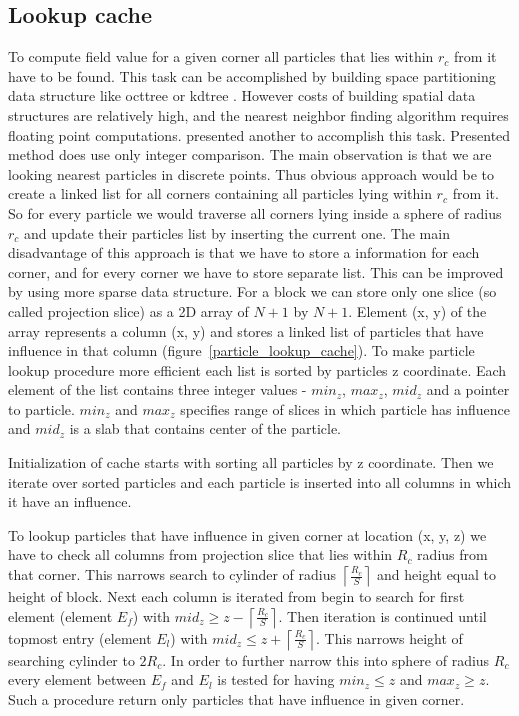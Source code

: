 \subsection{Lookup cache}\label{sec:lookupcache}
To compute field value for a given corner all particles that lies within $r_c$ from it have to be found. This task can be accomplished by building space partitioning data structure like octtree or kdtree \cite{Bentley1975}. However costs of building spatial data structures are relatively high, and the nearest neighbor finding algorithm requires floating point computations. \cite{RosenbergBirdwell2008} presented another to accomplish this task. Presented method does use only integer comparison. The main observation is that we are looking nearest particles in discrete points. Thus obvious approach would be to create a linked list for all corners containing all particles lying within $r_c$ from it. So for every particle we would traverse all corners lying inside a sphere of radius $r_c$ and update their particles list by inserting the current one.  The main disadvantage of this approach is that we have to store a information for each corner, and for every corner we have to store separate list. This can be improved by using more sparse data structure. For a block we can store only one slice (so called projection slice) as a 2D array of $N+1$ by $N+1$. Element (x, y) of the array represents a column (x, y) and stores a linked list of particles that have influence in that column (figure~\ref{particle_lookup_cache}). To make particle lookup procedure more efficient each list is sorted by particles z coordinate. Each element of the list contains three integer values - $min_z$, $max_z$, $mid_z$ and a pointer to particle. $min_z$ and $max_z$ specifies range of slices in which particle has influence and $mid_z$ is a slab that contains center of the particle. 


Initialization of cache starts with sorting all particles by z coordinate. Then we iterate over sorted particles and each particle is inserted into all columns in which it have an influence. 

To lookup particles that have influence in given corner at location (x, y, z) we have to check all columns from projection slice that lies within $R_c$ radius from that corner. This narrows search to cylinder of radius $\left \lceil \frac{R_c}{S} \right \rceil$ and height equal to height of block. Next each column is iterated from begin to search for first element (element $E_f$) with $mid_z \geq z - \left \lceil \frac{R_c}{S} \right \rceil$. Then iteration is continued until topmost entry (element $E_l$) with $mid_z \leq  z + \left \lceil \frac{R_c}{S} \right \rceil$. This narrows height of searching cylinder to $2R_c$. In order to further narrow this into sphere of radius $R_c$  every element between $E_f$ and $E_l$ is tested for having $min_z \leq z$ and $max_z \geq z$. Such a procedure return only particles that have influence in given corner. 

